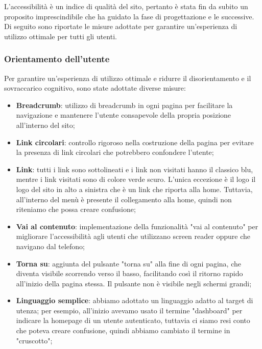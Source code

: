 L'accessibilità è un indice di qualità del sito, pertanto è stata fin da subito
un proposito imprescindibile che ha guidato la fase di progettazione e le
successive. Di seguito sono riportate le misure adottate per garantire
un'esperienza di utilizzo ottimale per tutti gli utenti.

\subsubsection{Orientamento dell'utente}

Per garantire un'esperienza di utilizzo ottimale e ridurre il disorientamento e
il sovraccarico cognitivo, sono state adottate diverse misure:

\begin{itemize}
	\item \textbf{Breadcrumb}: utilizzo di breadcrumb in ogni pagina per
	      facilitare la navigazione e mantenere l'utente consapevole della
	      propria posizione all'interno del sito;

	\item \textbf{Link circolari}: controllo rigoroso nella costruzione della
	      pagina per evitare la presenza di link circolari che potrebbero
	      confondere l'utente;

	\item \textbf{Link}: tutti i link sono sottolineati e i link non visitati
	      hanno il classico blu, mentre i link visitati sono di colore verde
	      scuro. L'unica eccezione è il logo il logo del sito in alto a sinistra
	      che è un link che riporta alla home. Tuttavia, all'interno del menù è
	      presente il collegamento alla home, quindi non riteniamo che possa
	      creare confusione;

	\item \textbf{Vai al contenuto}: implementazione della funzionalità "vai al
	      contenuto" per migliorare l'accessibilità agli utenti che utilizzano
	      screen reader oppure che navigano dal telefono;

	\item \textbf{Torna su}: aggiunta del pulsante "torna su" alla fine di
	      ogni pagina, che diventa visibile scorrendo verso il basso,
	      facilitando così il ritorno rapido all'inizio della pagina stessa.
	      Il pulsante non è visibile negli schermi grandi;

	\item \textbf{Linguaggio semplice}: abbiamo adottato un linguaggio adatto al
	      target di utenza; per esempio, all'inizio avevamo usato il termine
	      "dashboard" per indicare la homepage di un utente autenticato, tuttavia
	      ci siamo resi conto che poteva creare confusione, quindi abbiamo
	      cambiato il termine in "cruscotto";


\end{itemize}
